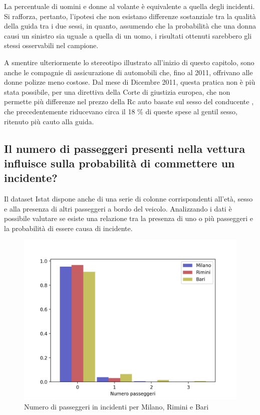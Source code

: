 \documentclass[a4paper,12pt]{report}
\begin{document}
La percentuale di uomini e donne al volante è equivalente a quella degli incidenti. 
Si rafforza, pertanto, l'ipotesi che non esistano differenze sostanziale tra la qualità 
della guida tra i due sessi, in quanto, assumendo che la probabilità che una donna causi un 
sinistro sia uguale a quella di un uomo, i risultati ottenuti sarebbero 
gli stessi osservabili nel campione. 

A smentire ulteriormente lo stereotipo illustrato all'inizio di questo capitolo, sono 
anche le compagnie di assicurazione di automobili che, fino al 2011, offrivano 
alle donne polizze meno costose. 
Dal mese di Dicembre 2011, questa pratica non è più stata possibile, per una direttiva della 
Corte di giustizia europea, che non permette più differenze nel prezzo della Rc auto basate 
sul sesso del conducente \cite{CORRIERE:1}, che precedentemente riducevano circa il 
18 \% di queste spese al gentil sesso, ritenuto più cauto alla guida. 

\subsection{Il numero di passeggeri presenti nella vettura influisce sulla probabilità di commettere un incidente?}

Il dataset Istat dispone anche di una serie di colonne corrispondenti all'età, sesso 
e alla presenza di altri passeggeri a bordo del veicolo.
Analizzando i dati è possibile valutare se esiste una 
relazione tra la presenza di uno o più passeggeri e la probabilità 
di essere causa di incidente.

\begin{figure}
    \includegraphics[width=\linewidth]{../src/incidenti/incidenti_senza_coords/passeggeri/passeggeri.png}
    \caption{Numero di passeggeri in incidenti per Milano, Rimini e Bari}
    \label{fig:passeggeri-milano-rimini}
\end{figure}
\end{document}
